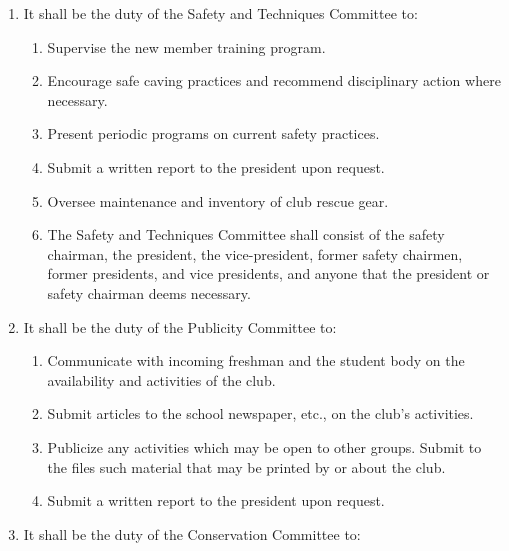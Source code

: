 \documentclass[
]{article}
\providecommand{\tightlist}{%
  \setlength{\itemsep}{0pt}\setlength{\parskip}{0pt}}
\begin{document}
\begin{enumerate}
\def\labelenumi{\arabic{enumi}.}
\tightlist
\item
  It shall be the duty of the Safety and Techniques Committee to:

  \begin{enumerate}
  \def\labelenumii{\Alph{enumii}.}
  \tightlist
  \item
    Supervise the new member training program.
  \item
    Encourage safe caving practices and recommend disciplinary action
    where necessary.
  \item
    Present periodic programs on current safety practices.
  \item
    Submit a written report to the president upon request.
  \item
    Oversee maintenance and inventory of club rescue gear.
  \item
    The Safety and Techniques Committee shall consist of the safety
    chairman, the president, the vice-president, former safety chairmen,
    former presidents, and vice presidents, and anyone that the
    president or safety chairman deems necessary.
  \end{enumerate}
\item
  It shall be the duty of the Publicity Committee to:

  \begin{enumerate}
  \def\labelenumii{\Alph{enumii}.}
  \tightlist
  \item
    Communicate with incoming freshman and the student body on the
    availability and activities of the club.
  \item
    Submit articles to the school newspaper, etc., on the club's
    activities.
  \item
    Publicize any activities which may be open to other groups. Submit
    to the files such material that may be printed by or about the club.
  \item
    Submit a written report to the president upon request.
  \end{enumerate}
\item
  It shall be the duty of the Conservation Committee to:


\end{enumerate}
\end{document}
